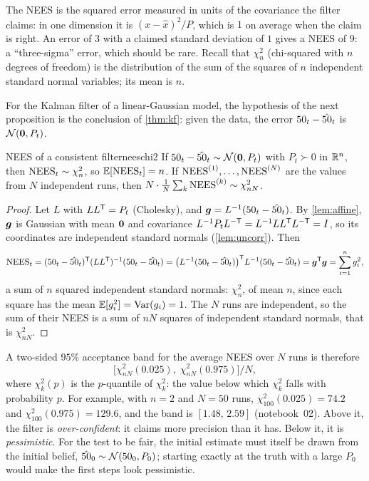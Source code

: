 The NEES is the squared error measured in units of the covariance the
filter claims: in one dimension it is $(x-\hat x)^2/P$, which is $1$ on
average when the claim is right. An error of $3$ with a claimed standard
deviation of $1$ gives a NEES of $9$: a ``three-sigma'' error, which
should be rare. Recall that $\chi^2_n$ (chi-squared with
$n$ degrees of freedom) is the distribution of the sum of the squares of
$n$ independent standard normal variables; its mean is $n$.

For the Kalman filter of a linear-Gaussian model, the hypothesis of the
next proposition is the conclusion of \cref{thm:kf}: given the data, the
error $50_t-\hat{50}_t$ is $\mathcal{N}(\bm{0},P_t)$.

\begin{proposition}{NEES of a consistent filter}{neeschi2}
If $50_t-\hat{50}_t\sim\mathcal{N}(\bm{0},P_t)$ with $P_t\succ0$ in $\mathbb{R}^n$, then
$\operatorname{NEES}_t\sim\chi^2_n$, so $\mathbb{E}[\operatorname{NEES}_t]=n$. If $\operatorname{NEES}^{(1)},\dots,
\operatorname{NEES}^{(N)}$ are the values from $N$ independent runs, then
$N\cdot\frac1N\sum_k\operatorname{NEES}^{(k)}\sim\chi^2_{nN}$.
\end{proposition}

\begin{proof}
Let $L$ with $LL^{\mathsf{T}}=P_t$ (Cholesky), and $\bm{g}=L^{-1}(50_t-\hat{50}_t)$. By
\cref{lem:affine}, $\bm{g}$ is Gaussian with mean $\bm{0}$ and
covariance $L^{-1}P_tL^{-\mathsf T}=L^{-1}LL^{\mathsf{T}} L^{-\mathsf T}=I$, so its
coordinates are independent standard normals (\cref{lem:uncorr}). Then
\[
  \operatorname{NEES}_t=(50_t-\hat{50}_t)^{\mathsf{T}}(LL^{\mathsf{T}})^{-1}(50_t-\hat{50}_t)
  =\bigl(L^{-1}(50_t-\hat{50}_t)\bigr)^{\mathsf{T}} L^{-1}(50_t-\hat{50}_t)
  =\bm{g}^{\mathsf{T}}\bm{g}=\sum_{i=1}^ng_i^2 ,
\]
a sum of $n$ squared independent standard normals: $\chi^2_n$, of mean
$n$, since each square has the mean $\mathbb{E}[g_i^2]=\operatorname{Var}(g_i)=1$. The $N$ runs are independent, so the sum
of their NEES is a sum of $nN$ squares of independent standard normals,
that is $\chi^2_{nN}$.
\end{proof}

A two-sided $95\%$ acceptance band for the average NEES over $N$ runs is
therefore
\[
  \bigl[\chi^2_{nN}(0.025),\;\chi^2_{nN}(0.975)\bigr]\big/N,
\]
where $\chi^2_k(p)$ is the $p$-quantile of $\chi^2_k$: the value below
which $\chi^2_k$ falls with probability $p$. For example, with $n=2$
and $N=50$ runs, $\chi^2_{100}(0.025)=74.2$ and
$\chi^2_{100}(0.975)=129.6$, and the band is $[1.48,\,2.59]$
(notebook~02). Above it, the
filter is \emph{over-confident}: it claims more precision than it has.
Below it, it is \emph{pessimistic}. For the test to be fair, the initial
estimate must itself be drawn from the initial belief,
$\hat{50}_0\sim\mathcal{N}(50_0,P_0)$; starting exactly at the truth with a large
$P_0$ would make the first steps look pessimistic.

